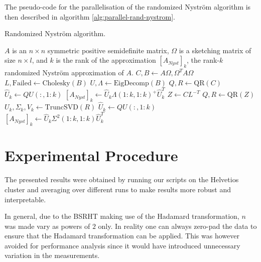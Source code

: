 \documentclass[a4paper, 12pt,oneside]{article}
\begin{document}
	The pseudo-code for the parallelisation of the randomized Nystr\"om algorithm is then described in algorithm \ref{alg:parallel-rand-nystrom}.
	\begin{algorithm}[htb]
		\caption{Randomized Nystr\"om algorithm.}\label{alg:parallel-rand-nystrom}
		\begin{algorithmic}
		\Require $A$ is an $n\times n$ symmetric positive semidefinite matrix, $\Omega$ is a sketching matrix of size $n\times l$, and $k$ is the rank of the approximation
		\Ensure $[A_{N y s t}]_k$, the rank-$k$ randomized Nystr\"om approximation of $A$. 
		\State $C, B \gets A \Omega, \Omega^T A\Omega$ 
		\State $L, \text{Failed} \gets \text{Cholesky}(B)$ 
			\State $U, \Lambda \gets \text{EigDecomp}(B)$ 
			\State $Q, R \gets \text{QR}(C)$ 
			\State $\hat{U}_k \gets Q U(:, 1:k)$ 
			\State $[A_{N y s t}]_k \gets \hat{U}_k \Lambda(1: k, 1: k)^{+} \hat{U}_k^T$ 
		\Else{}
			\State $Z \gets C L^{-T}$ 
			\State $Q, R \gets \text{QR}(Z)$ 
			\State $U_k, \Sigma_k, V_k \gets \text{TruncSVD}(R)$ 
			\State $\hat{U}_k \gets Q U(:, 1:k)$ 
			\State $[A_{N y s t}]_k \gets \hat{U}_k \Sigma^2(1: k, 1: k) \hat{U}_k^T$ 
		\EndIf
		\end{algorithmic}
	\end{algorithm}
	\section{Experimental Procedure}
		The presented results were obtained by running our scripts on the Helvetios cluster and averaging over different runs to make results more robust and interpretable. 
		
		In general, due to the BSRHT making use of the Hadamard transformation, $n$ was made vary as powers of $2$ only. In reality one can always zero-pad the data to ensure that the Hadamard transformation can be applied. This was however avoided for performance analysis since it would have introduced unnecessary variation in the measurements.  
\end{document}
